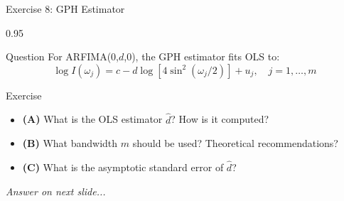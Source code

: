 \documentclass[9pt, aspectratio=169, t]{beamer}
\begin{document}
\begin{frame}{Exercise 8: GPH Estimator}
    \begin{cminipage}{0.95\textwidth}
    {\small
    \begin{alertblock}{Question}
        For ARFIMA(0,$d$,0), the GPH estimator fits OLS to:
        \[
            \log I(\omega_j) = c - d\log[4\sin^2(\omega_j/2)] + u_j, \quad j=1,\ldots,m
        \]
    \end{alertblock}

    \vspace{0.15cm}

    \begin{block}{Exercise}
        \begin{itemize}\setlength{\itemsep}{3pt}
            \item \textcolor{MainBlue}{\textbf{(A)}} What is the OLS estimator $\hat{d}$? How is it computed?
            \item \textcolor{MainBlue}{\textbf{(B)}} What bandwidth $m$ should be used? Theoretical recommendations?
            \item \textcolor{MainBlue}{\textbf{(C)}} What is the asymptotic standard error of $\hat{d}$?
        \end{itemize}
    \end{block}

    \vspace{0.15cm}

    \begin{center}
        \textit{Answer on next slide...}
    \end{center}
    }
    \end{cminipage}
\end{frame}
\end{document}

